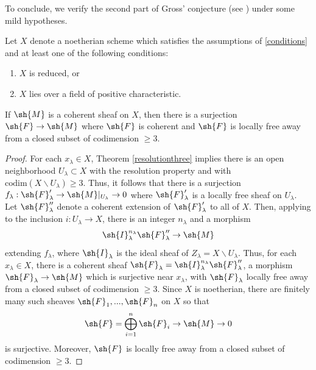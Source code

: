 \documentclass[12pt]{amsart}
\begin{document}
To conclude, we verify the second part of Gross' conjecture (see \cite[Conj. 2.0.3]{Grossthesis}) under some mild hypotheses.

\begin{corollary} \label{surjectionthree} Let $X$ denote a noetherian scheme which satisfies the assumptions of \ref{conditions} and at least one of the following conditions:
\begin{enumerate} 
\item $X$ is reduced, or
\item $X$ lies over a field of positive characteristic.
\end{enumerate}
If $\sh{M}$ is a coherent sheaf on $X$, then there is a surjection $\sh{F} \to \sh{M}$ where $\sh{F}$ is coherent and $\sh{F}$ is locally free away from a closed subset of codimension $\geq 3$. 
\end{corollary}

\begin{proof} For each $x_{\lambda} \in X$, Theorem \ref{resolutionthree} implies there is an open neighborhood $U_{\lambda} \subset X$ with the resolution property and with $\text{codim}(X \smallsetminus U_{\lambda}) \geq 3$. Thus, it follows that there is a surjection $f_{\lambda}: \sh{F}_{\lambda}' \to \sh{M}|_{U_{\lambda}} \to 0$ where $\sh{F}_{\lambda}'$ is a locally free sheaf on $U_{\lambda}$. Let $\sh{F}_{\lambda}''$ denote a coherent extension of $\sh{F}_{\lambda}'$ to all of $X$. Then, applying \cite[Prop. 6.9.17]{EGAI.2} to the inclusion $i: U_{\lambda} \to X$, there is an integer $n_{\lambda}$ and a morphism
\[\sh{I}_{\lambda}^{n_{\lambda}}\sh{F}_{\lambda}'' \to \sh{M}\]
extending $f_{\lambda}$, where $\sh{I}_{\lambda}$ is the ideal sheaf of $Z_{\lambda}=X \smallsetminus U_{\lambda}$. Thus, for each $x_{\lambda} \in X$, there is a coherent sheaf $\sh{F}_{\lambda}=\sh{I}_{\lambda}^{n_{\lambda}}\sh{F}_{\lambda}''$, a morphism $\sh{F}_{\lambda} \to \sh{M}$ which is surjective near $x_{\lambda}$, with $\sh{F}_{\lambda}$ locally free away from a closed subset of codimension $\geq 3$. Since $X$ is noetherian, there are finitely many such sheaves $\sh{F}_{1},...,\sh{F}_{n}$ on $X$ so that 
\[\sh{F}=\bigoplus_{i=1}^n \sh{F}_{i} \to \sh{M} \to 0\]
is surjective. Moreover, $\sh{F}$ is locally free away from a closed subset of codimension $\geq 3$. \end{proof}


{}

\end{document}
